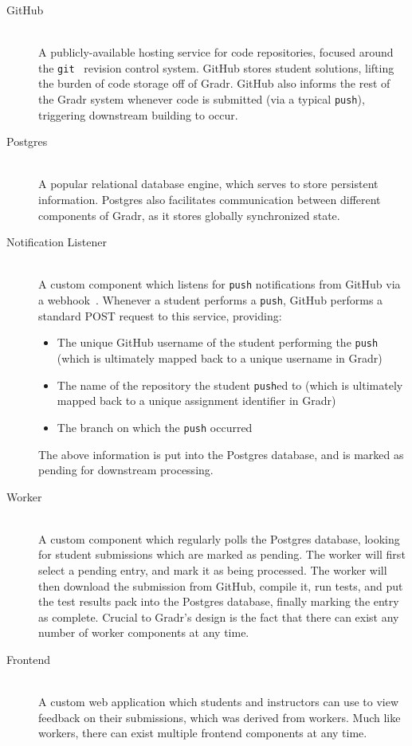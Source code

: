 \documentclass{scrartcl}
\begin{document}
\begin{description}
  \item[GitHub~\cite{github}] \hfill \\
    A publicly-available hosting service for code repositories, focused around the \texttt{git}~\cite{git} revision control system.
    GitHub stores student solutions, lifting the burden of code storage off of Gradr.
    GitHub also informs the rest of the Gradr system whenever code is submitted (via a typical \texttt{push}), triggering downstream building to occur.

  \item[Postgres~\cite{postgres}] \hfill \\
    A popular relational database engine, which serves to store persistent information.
    Postgres also facilitates communication between different components of Gradr, as it stores globally synchronized state.

  \item[Notification Listener] \hfill \\
    A custom component which listens for \texttt{push} notifications from GitHub via a webhook~\cite{github_webhook}.
    Whenever a student performs a \texttt{push}, GitHub performs a standard POST request to this service, providing:
    \begin{itemize}
      \item The unique GitHub username of the student performing the \texttt{push} (which is ultimately mapped back to a unique username in Gradr)
      \item The name of the repository the student \texttt{push}ed to (which is ultimately mapped back to a unique assignment identifier in Gradr)
      \item The branch on which the \texttt{push} occurred
    \end{itemize}
    The above information is put into the Postgres database, and is marked as pending for downstream processing.

  \item[Worker] \hfill \\
    A custom component which regularly polls the Postgres database, looking for student submissions which are marked as pending.
    The worker will first select a pending entry, and mark it as being processed.
    The worker will then download the submission from GitHub, compile it, run tests, and put the test results pack into the Postgres database, finally marking the entry as complete.
    Crucial to Gradr's design is the fact that there can exist any number of worker components at any time.

  \item[Frontend] \hfill \\
    A custom web application which students and instructors can use to view feedback on their submissions, which was derived from workers.
    Much like workers, there can exist multiple frontend components at any time.
\end{description}
\end{document}
